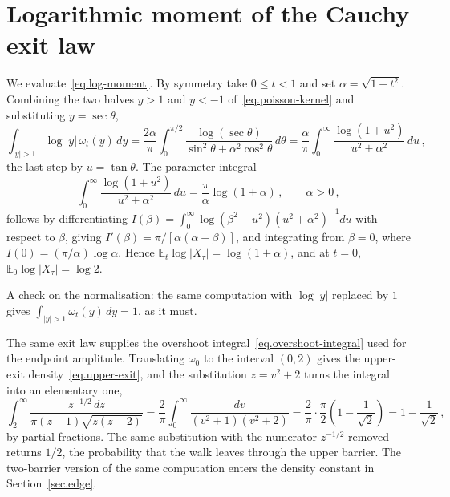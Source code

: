 \documentclass[11pt,a4paper]{article}
\theoremstyle{definition}
\begin{document}
\section{Logarithmic moment of the Cauchy exit law}
\label{app.exit-moment}

We evaluate~\eqref{eq.log-moment}.  By symmetry take $0 \leq t < 1$ and set
$\alpha = \sqrt{1-t^2}$.  Combining the two halves $y>1$ and $y<-1$
of~\eqref{eq.poisson-kernel} and substituting $y = \sec\theta$,
\begin{equation}
  \int_{|y|>1}\log|y|\,\omega_t(y)\,dy
  = \frac{2\alpha}{\pi}\int_0^{\pi/2}
    \frac{\log(\sec\theta)}{\sin^2\theta + \alpha^2\cos^2\theta}\,d\theta
  = \frac{\alpha}{\pi}\int_0^{\infty}
    \frac{\log(1+u^2)}{u^2+\alpha^2}\,du\,,
\end{equation}
the last step by $u = \tan\theta$.  The parameter integral
\begin{equation}\label{eq.param-integral}
  \int_0^{\infty}\frac{\log(1+u^2)}{u^2+\alpha^2}\,du
  = \frac{\pi}{\alpha}\log(1+\alpha)\,,
  \qquad \alpha>0\,,
\end{equation}
follows by differentiating
$I(\beta) = \int_0^\infty \log(\beta^2+u^2)(u^2+\alpha^2)^{-1}du$ with respect
to $\beta$, giving $I'(\beta) = \pi/[\alpha(\alpha+\beta)]$, and integrating
from $\beta = 0$, where $I(0) = (\pi/\alpha)\log\alpha$.  Hence
$\mathbb{E}_t\log|X_\tau| = \log(1+\alpha)$, and at $t=0$,
$\mathbb{E}_0\log|X_\tau| = \log 2$.

A check on the normalisation: the same computation with $\log|y|$ replaced by
$1$ gives $\int_{|y|>1}\omega_t(y)\,dy = 1$, as it must.

The same exit law supplies the overshoot integral~\eqref{eq.overshoot-integral}
used for the endpoint amplitude.  Translating $\omega_0$ to the interval $(0,2)$
gives the upper-exit density~\eqref{eq.upper-exit}, and the substitution
$z = v^2+2$ turns the integral into an elementary one,
\begin{equation}
  \int_2^{\infty}\frac{z^{-1/2}\,dz}{\pi(z-1)\sqrt{z(z-2)}}
  = \frac{2}{\pi}\int_0^{\infty}\frac{dv}{(v^2+1)(v^2+2)}
  = \frac{2}{\pi}\cdot\frac{\pi}{2}\left(1 - \frac{1}{\sqrt2}\right)
  = 1 - \frac{1}{\sqrt2}\,,
\end{equation}
by partial fractions.  The same substitution with the numerator $z^{-1/2}$
removed returns $1/2$, the probability that the walk leaves through the upper
barrier.  The two-barrier version of the same computation enters the density
constant in Section~\ref{sec.edge}.
\end{document}
